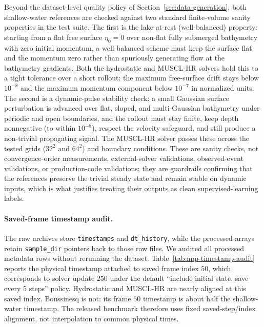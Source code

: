 Beyond the dataset-level quality policy of Section~\ref{sec:data-generation}, both shallow-water references are checked against two standard finite-volume sanity properties in the test suite. The first is the lake-at-rest (well-balanced) property: starting from a flat free surface $\eta_0 = 0$ over non-flat fully submerged bathymetry with zero initial momentum, a well-balanced scheme must keep the surface flat and the momentum zero rather than spuriously generating flow at the bathymetry gradients. Both the hydrostatic and MUSCL-HR solvers hold this to a tight tolerance over a short rollout: the maximum free-surface drift stays below $10 ^ {-8}$ and the maximum momentum component below $10 ^ {-7}$ in normalized units. The second is a dynamic-pulse stability check: a small Gaussian surface perturbation is advanced over flat, sloped, and multi-Gaussian bathymetry under periodic and open boundaries, and the rollout must stay finite, keep depth nonnegative (to within $10 ^ {-8}$), respect the velocity safeguard, and still produce a non-trivial propagating signal. The MUSCL-HR solver passes these across the tested grids ($32 ^ 2$ and $64 ^ 2$) and boundary conditions. These are sanity checks, not convergence-order measurements, external-solver validations, observed-event validations, or production-code validations; they are guardrails confirming that the references preserve the trivial steady state and remain stable on dynamic inputs, which is what justifies treating their outputs as clean supervised-learning labels.

\paragraph{Saved-frame timestamp audit.}
The raw archives store \texttt{timestamps} and \texttt{dt\_history}, while the processed arrays retain \texttt{sample\_dir} pointers back to those raw files. We audited all processed metadata rows without rerunning the dataset. Table~\ref{tab:app-timestamp-audit} reports the physical timestamp attached to saved frame index $50$, which corresponds to solver update $250$ under the default ``include initial state, save every 5 steps'' policy. Hydrostatic and MUSCL-HR are nearly aligned at this saved index. Boussinesq is not: its frame $50$ timestamp is about half the shallow-water timestamp. The released benchmark therefore uses fixed saved-step/index alignment, not interpolation to common physical times.


